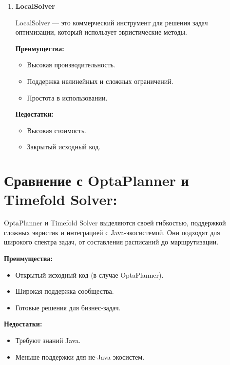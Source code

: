 \begin{enumerate}
\vspace{6mm}

\item \noindent \textbf {LocalSolver}

  LocalSolver — это коммерческий инструмент для решения задач оптимизации, который использует эвристические методы.
  
\vspace{6mm}

\noindent \textbf{Преимущества:}
\begin{itemize}
    \item Высокая производительность.
    \item Поддержка нелинейных и сложных ограничений.
    \item Простота в использовании.
\end{itemize}

\vspace{6mm}

\noindent \textbf{Недостатки:}
\begin{itemize}
\item Высокая стоимость.
\item Закрытый исходный код.
\end{itemize}

\end{enumerate}

\section{ Сравнение с OptaPlanner и Timefold Solver:}

OptaPlanner и Timefold Solver выделяются своей гибкостью, поддержкой сложных эвристик и интеграцией с Java-экосистемой. Они подходят для широкого спектра задач, от составления расписаний до маршрутизации.
\vspace{6mm}

\noindent \textbf{Преимущества:}
\begin{itemize}
    \item Открытый исходный код (в случае OptaPlanner).
    \item Широкая поддержка сообщества.
    \item Готовые решения для бизнес-задач.
\end{itemize}

\vspace{6mm}

\noindent \textbf{Недостатки:}
\begin{itemize}
\item Требуют знаний Java.
\item Меньше поддержки для не-Java экосистем.
\end{itemize}

